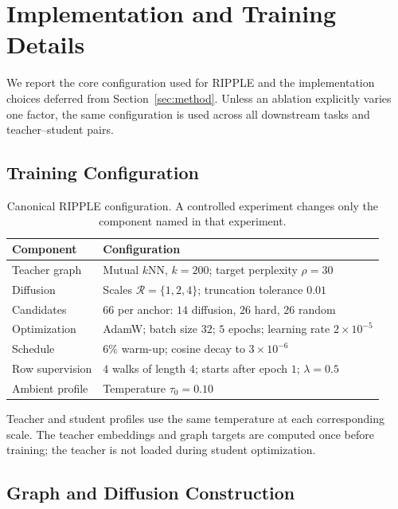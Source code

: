 \section{Implementation and Training Details}
\label{app:hyper}

We report the core configuration used for RIPPLE and the implementation
choices deferred from Section~\ref{sec:method}. Unless an ablation explicitly
varies one factor, the same configuration is used across all downstream tasks
and teacher--student pairs.

\subsection{Training Configuration}
\label{app:canonical-config}

\begin{table}[t]
\centering
\small
\setlength{\tabcolsep}{5pt}
\begin{tabular}{ll}
\toprule
Component & Configuration \\
\midrule
Teacher graph & Mutual $k$NN, $k=200$; target perplexity $\rho=30$ \\
Diffusion & Scales $\mathcal R=\{1,2,4\}$; truncation tolerance $0.01$ \\
Candidates & $66$ per anchor: $14$ diffusion, $26$ hard, $26$ random \\
Optimization & AdamW; batch size $32$; $5$ epochs; learning rate $2\times10^{-5}$ \\
Schedule & $6\%$ warm-up; cosine decay to $3\times10^{-6}$ \\
Row supervision & $4$ walks of length $4$; starts after epoch $1$; $\lambda=0.5$ \\
Ambient profile & Temperature $\tau_0=0.10$ \\
\bottomrule
\end{tabular}
\caption{Canonical RIPPLE configuration. A controlled experiment changes
only the component named in that experiment.}
\label{tab:ripple-config}
\end{table}

Teacher and student profiles use the same temperature at each corresponding
scale. The teacher embeddings and graph targets are computed once before
training; the teacher is not loaded during student optimization.

\subsection{Graph and Diffusion Construction}

